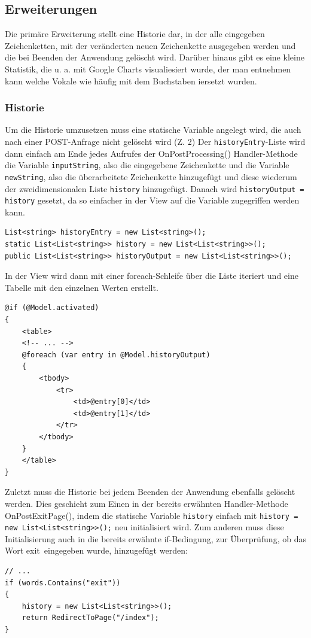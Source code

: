 \documentclass[a4paper,
12pt,
oneside]
{article}
\begin{document}
	
	\subsection{Erweiterungen}
	Die primäre Erweiterung stellt eine Historie dar, in der alle eingegeben Zeichenketten, mit der veränderten neuen Zeichenkette ausgegeben werden und die bei Beenden der Anwendung gelöscht wird. Darüber hinaus gibt es eine kleine Statistik, die u. a. mit Google Charts visualiesiert wurde, der man entnehmen kann welche Vokale wie häufig mit dem Buchstaben \glqq i\grqq ersetzt wurden.
	
	\subsubsection{Historie}
	Um die Historie umzusetzen muss eine statische Variable angelegt wird, die auch nach einer POST-Anfrage nicht gelöscht wird (Z. 2) Der \texttt{historyEntry}-Liste wird dann einfach am Ende jedes Aufrufes der OnPostProcessing() Handler-Methode die Variable \texttt{inputString}, also die eingegebene Zeichenkette und die Variable \texttt{newString}, also die überarbeitete Zeichenkette hinzugefügt und diese wiederum der zweidimensionalen Liste \texttt{history} hinzugefügt. Danach wird \texttt{historyOutput = history} gesetzt, da so einfacher in der View auf die Variable zugegriffen werden kann.
	\lstset{style=csharp}
	\begin{lstlisting}
List<string> historyEntry = new List<string>();
static List<List<string>> history = new List<List<string>>();
public List<List<string>> historyOutput = new List<List<string>>();
	\end{lstlisting} 
	In der View wird dann mit einer foreach-Schleife über die Liste iteriert und eine Tabelle mit den einzelnen Werten erstellt.
	 \lstset{style=cshtml}
	 \begin{lstlisting}
@if (@Model.activated)
{
	<table>
	<!-- ... -->
	@foreach (var entry in @Model.historyOutput)
	{
		<tbody>
			<tr>
				<td>@entry[0]</td>
				<td>@entry[1]</td>
			</tr>
		</tbody>
	}
	</table>
}
	 \end{lstlisting}
	 Zuletzt muss die Historie bei jedem Beenden der Anwendung ebenfalls gelöscht werden. Dies geschieht zum Einen in der bereits erwähnten Handler-Methode OnPostExitPage(), indem die statische Variable \texttt{history} einfach mit \texttt{history = new List<List<string>>();} neu initialisiert wird. Zum anderen muss diese Initialisierung auch in die bereits erwähnte if-Bedingung, zur Überprüfung, ob das Wort \glqq exit\grqq~eingegeben wurde, hinzugefügt werden:
	 \lstset{style=csharp}
	 \begin{lstlisting}
// ...
if (words.Contains("exit"))
{
	history = new List<List<string>>();
	return RedirectToPage("/index");
}
	 \end{lstlisting}
	 
\end{document}
